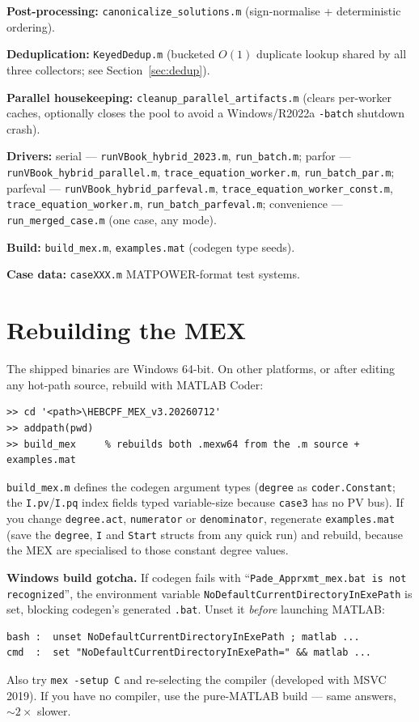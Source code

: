 \documentclass[11pt,a4paper]{article}
\newcommand{\code}[1]{\texttt{#1}}
\begin{document}
\textbf{Post-processing:} \code{canonicalize_solutions.m} (sign-normalise + deterministic
ordering).

\textbf{Deduplication:} \code{KeyedDedup.m} (bucketed $O(1)$ duplicate lookup shared by all
three collectors; see Section~\ref{sec:dedup}).

\textbf{Parallel housekeeping:} \code{cleanup_parallel_artifacts.m} (clears per-worker
caches, optionally closes the pool to avoid a Windows/R2022a \code{-batch} shutdown
crash).

\textbf{Drivers:}
serial --- \code{runVBook_hybrid_2023.m}, \code{run_batch.m};
parfor --- \code{runVBook_hybrid_parallel.m}, \code{trace_equation_worker.m},
\code{run_batch_par.m};
parfeval --- \code{runVBook_hybrid_parfeval.m}, \code{trace_equation_worker_const.m},
\code{trace_equation_worker.m}, \code{run_batch_parfeval.m};
convenience --- \code{run_merged_case.m} (one case, any mode).

\textbf{Build:} \code{build_mex.m}, \code{examples.mat} (codegen type seeds).

\textbf{Case data:} \code{caseXXX.m} MATPOWER-format test systems.

\section{Rebuilding the MEX}\label{sec:mex}

The shipped binaries are Windows 64-bit. On other platforms, or after editing any
hot-path source, rebuild with MATLAB Coder:
\begin{lstlisting}[style=mat]
>> cd '<path>\HEBCPF_MEX_v3.20260712'
>> addpath(pwd)
>> build_mex     % rebuilds both .mexw64 from the .m source + examples.mat
\end{lstlisting}
\code{build_mex.m} defines the codegen argument types (\code{degree} as
\code{coder.Constant}; the \code{I.pv}/\code{I.pq} index fields typed variable-size
because \code{case3} has no PV bus). If you change \code{degree.act}, \code{numerator} or
\code{denominator}, regenerate \code{examples.mat} (save the \code{degree}, \code{I} and
\code{Start} structs from any quick run) and rebuild, because the MEX are specialised to
those constant degree values.

\textbf{Windows build gotcha.} If codegen fails with
``\code{Pade_Apprxmt_mex.bat is not recognized}'', the environment variable
\code{NoDefaultCurrentDirectoryInExePath} is set, blocking codegen's generated \code{.bat}.
Unset it \emph{before} launching MATLAB:
\begin{lstlisting}[style=sh]
bash :  unset NoDefaultCurrentDirectoryInExePath ; matlab ...
cmd  :  set "NoDefaultCurrentDirectoryInExePath=" && matlab ...
\end{lstlisting}
Also try \code{mex -setup C} and re-selecting the compiler (developed with MSVC 2019). If
you have no compiler, use the pure-MATLAB build --- same answers, $\sim 2\times$ slower.
\end{document}
